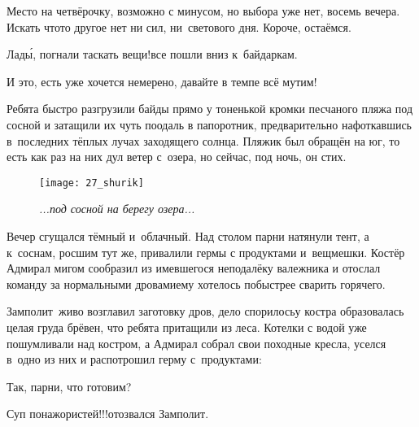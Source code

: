 \diagdash Место на четвёрочку, возможно с минусом, но выбора уже нет, восемь вечера. Искать что\sdash то другое нет ни сил, ни~светового дня. Короче, остаёмся.

\diagdash Лад\'{ы}, погнали таскать вещи!\mdash все пошли вниз к~байдаркам.

\diagdash И это, есть уже хочется немерено, давайте в темпе всё мутим!

Ребята быстро разгрузили байды прямо у тоненькой кромки песчаного пляжа под сосной и затащили их чуть поодаль в папоротник, предварительно нафоткавшись в~последних тёплых лучах заходящего солнца. Пляжик был обращён на юг, то есть как раз на них дул ветер с~озера, но сейчас, под ночь, он стих.

\begin{wrapfigure}[23]{l}{0.6\textwidth}
	\centering
	\texttt{[image: 27\_shurik]}
	\caption{\small\textit{...под сосной на берегу озера...}}
\end{wrapfigure}

Вечер сгущался тёмный и~облачный. 
Над столом парни натянули тент, а к~соснам, росшим тут же, привалили гермы с продуктами и~вещмешки. 
Костёр Адмирал мигом сообразил из имевшегося неподалёку валежника и отослал команду за нормальными дровами\mdash ему хотелось побыстрее сварить горячего.

Замполит~живо возглавил заготовку дров, дело спорилось\mdash у костра образовалась целая груда брёвен, что ребята притащили из леса. Котелки с водой уже пошумливали над костром, а Адмирал собрал свои походные кресла, уселся в~одно из них и распотрошил герму с~продуктами:

\diagdash Так, парни, что готовим?

\diagdash Суп понажористей!!!\mdash отозвался Замполит.


